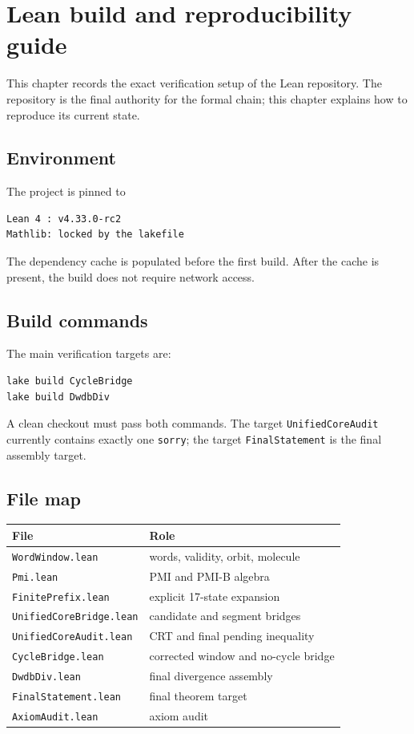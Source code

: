 \section{Lean build and reproducibility guide}

This chapter records the exact verification setup of the Lean
repository.  The repository is the final authority for the formal
chain; this chapter explains how to reproduce its current state.

\subsection{Environment}

The project is pinned to
\begin{verbatim}
Lean 4 : v4.33.0-rc2
Mathlib: locked by the lakefile
\end{verbatim}
The dependency cache is populated before the first build.  After the
cache is present, the build does not require network access.

\subsection{Build commands}

The main verification targets are:
\begin{verbatim}
lake build CycleBridge
lake build DwdbDiv
\end{verbatim}
A clean checkout must pass both commands.  The target
\texttt{UnifiedCoreAudit} currently contains exactly one
\texttt{sorry}; the target \texttt{FinalStatement} is the final
assembly target.

\subsection{File map}

\begin{center}
\small
\begin{tabular}{@{}p{}p{}@{}}
\toprule
File & Role \\
\midrule
\texttt{WordWindow.lean} & words, validity, orbit, molecule \\
\texttt{Pmi.lean} & PMI and PMI-B algebra \\
\texttt{FinitePrefix.lean} & explicit 17-state expansion \\
\texttt{UnifiedCoreBridge.lean} & candidate and segment bridges \\
\texttt{UnifiedCoreAudit.lean} & CRT and final pending inequality \\
\texttt{CycleBridge.lean} & corrected window and no-cycle bridge \\
\texttt{DwdbDiv.lean} & final divergence assembly \\
\texttt{FinalStatement.lean} & final theorem target \\
\texttt{AxiomAudit.lean} & axiom audit \\
\bottomrule
\end{tabular}
\end{center}

